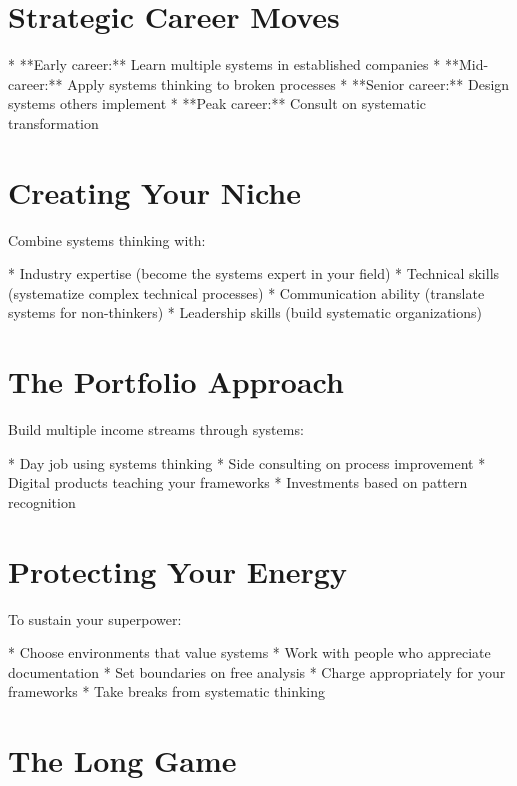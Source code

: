 \documentclass[12pt,oneside]{book}
\begin{document}
\section{Strategic Career Moves}

                    * **Early career:** Learn multiple systems in established companies
                    * **Mid-career:** Apply systems thinking to broken processes
                    * **Senior career:** Design systems others implement
                    * **Peak career:** Consult on systematic transformation

\section{Creating Your Niche}

Combine systems thinking with:

                    * Industry expertise (become the systems expert in your field)
                    * Technical skills (systematize complex technical processes)
                    * Communication ability (translate systems for non-thinkers)
                    * Leadership skills (build systematic organizations)

\section{The Portfolio Approach}

Build multiple income streams through systems:

                    * Day job using systems thinking
                    * Side consulting on process improvement
                    * Digital products teaching your frameworks
                    * Investments based on pattern recognition

\section{Protecting Your Energy}

To sustain your superpower:

                    * Choose environments that value systems
                    * Work with people who appreciate documentation
                    * Set boundaries on free analysis
                    * Charge appropriately for your frameworks
                    * Take breaks from systematic thinking

\section{The Long Game}
\end{document}
